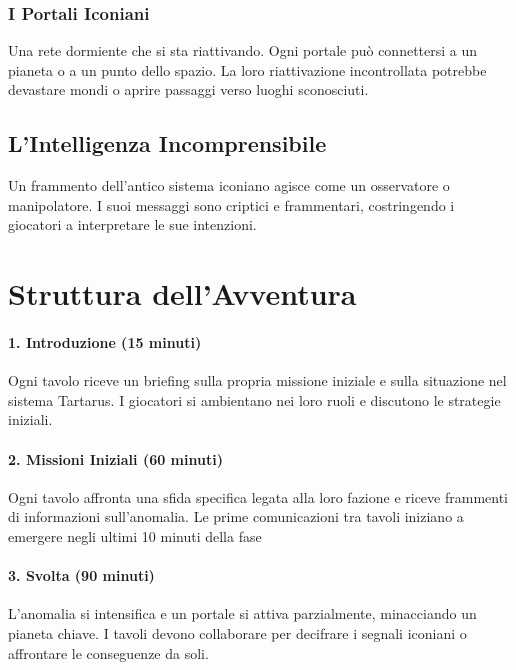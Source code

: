 \documentclass[letterpaper,twocolumn,openany,nodeprecatedcode]{dndbook}
\begin{document}
\subsubsection{ I Portali Iconiani
}

Una rete dormiente che si sta riattivando. Ogni portale può connettersi a un pianeta o a un punto dello spazio. La loro riattivazione incontrollata potrebbe devastare mondi o aprire passaggi verso luoghi sconosciuti.

\subsection{ L’Intelligenza Incomprensibile
}

Un frammento dell’antico sistema iconiano agisce come un osservatore o manipolatore. I suoi messaggi sono criptici e frammentari, costringendo i giocatori a interpretare le sue intenzioni.



\section{ Struttura dell’Avventura
}

\paragraph{1. Introduzione (15 minuti)}

   Ogni tavolo riceve un briefing sulla propria missione iniziale e sulla situazione nel sistema Tartarus.
   I giocatori si ambientano nei loro ruoli e discutono le strategie iniziali.

\paragraph{2. Missioni Iniziali (60 minuti)}

   Ogni tavolo affronta una sfida specifica legata alla loro fazione e riceve frammenti di informazioni sull’anomalia.
   Le prime comunicazioni tra tavoli iniziano a emergere negli ultimi 10 minuti della fase

\paragraph{3. Svolta (90 minuti)}

   L’anomalia si intensifica e un portale si attiva parzialmente, minacciando un pianeta chiave.
   I tavoli devono collaborare per decifrare i segnali iconiani o affrontare le conseguenze da soli.
\end{document}

